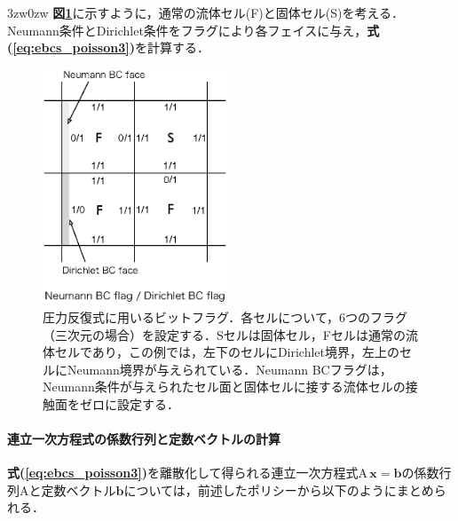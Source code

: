 \begin{indentation}{3zw}{0zw}
\textbf{図\ref{fig:N&D bit flag}}に示すように，通常の流体セル(F)と固体セル(S)を考える．Neumann条件とDirichlet条件をフラグにより各フェイスに与え，\textbf{式(\ref{eq:ebcs_poisson3})}を計算する．

\begin{figure}[htbp]
\begin{center}
\includegraphics[width=5.5cm,clip]{bit_flag_P.eps}
\end{center}
\caption{圧力反復式に用いるビットフラグ．各セルについて，6つのフラグ（三次元の場合）を設定する．Sセルは固体セル，Fセルは通常の流体セルであり，この例では，左下のセルにDirichlet境界，左上のセルにNeumann境界が与えられている．Neumann BCフラグは，Neumann条件が与えられたセル面と固体セルに接する流体セルの接触面をゼロに設定する．}
\label{fig:N&D bit flag}
\end{figure}


%
\paragraph{連立一次方程式の係数行列と定数ベクトルの計算}
\textbf{式(\ref{eq:ebcs_poisson3})}を離散化して得られる連立一次方程式$\mathrm{A}\,\bm{x}=\bm{b}$の係数行列$\mathrm{A}$と定数ベクトル$\bm{b}$については，前述したポリシーから以下のようにまとめられる．


\end{indentation}
